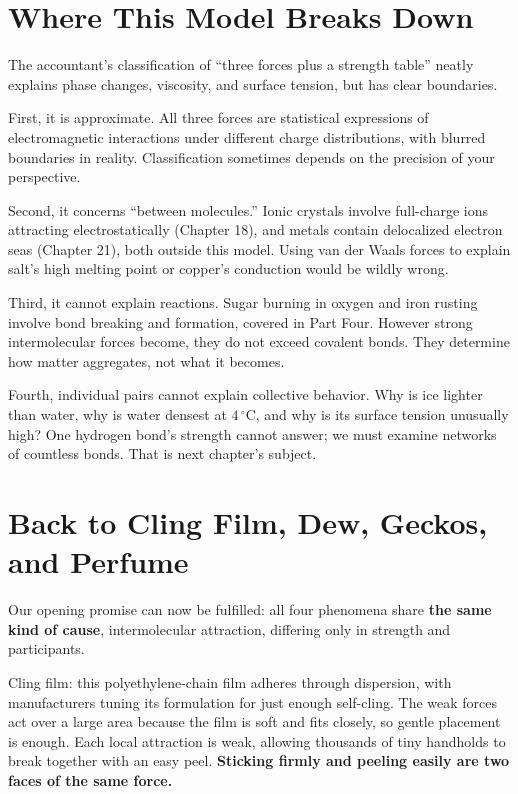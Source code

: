 \section{Where This Model Breaks Down}

The accountant's classification of ``three forces plus a strength table'' neatly explains phase changes, viscosity, and surface tension, but has clear boundaries.

First, it is approximate. All three forces are statistical expressions of electromagnetic interactions under different charge distributions, with blurred boundaries in reality. Classification sometimes depends on the precision of your perspective.

Second, it concerns ``between molecules.'' Ionic crystals involve full-charge ions attracting electrostatically (Chapter 18), and metals contain delocalized electron seas (Chapter 21), both outside this model. Using van der Waals forces to explain salt's high melting point or copper's conduction would be wildly wrong.

Third, it cannot explain reactions. Sugar burning in oxygen and iron rusting involve bond breaking and formation, covered in Part Four. However strong intermolecular forces become, they do not exceed covalent bonds. They determine how matter aggregates, not what it becomes.

Fourth, individual pairs cannot explain collective behavior. Why is ice lighter than water, why is water densest at $4\,^{\circ}\mathrm{C}$, and why is its surface tension unusually high? One hydrogen bond's strength cannot answer; we must examine networks of countless bonds. That is next chapter's subject.

\section{Back to Cling Film, Dew, Geckos, and Perfume}

Our opening promise can now be fulfilled: all four phenomena share \textbf{the same kind of cause}, intermolecular attraction, differing only in strength and participants.

Cling film: this polyethylene-chain film adheres through dispersion, with manufacturers tuning its formulation for just enough self-cling. The weak forces act over a large area because the film is soft and fits closely, so gentle placement is enough. Each local attraction is weak, allowing thousands of tiny handholds to break together with an easy peel. \textbf{Sticking firmly and peeling easily are two faces of the same force.}

